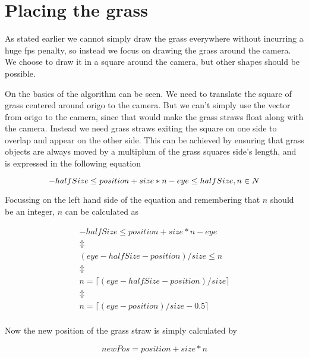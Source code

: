 \section{Placing the grass}

As stated earlier we cannot simply draw the grass everywhere without
incurring a huge fps penalty, so instead we focus on drawing the grass
around the camera. We choose to draw it in a square around the camera,
but other shapes should be possible.


On  the basics of the algorithm can be
seen. We need to translate the square of grass centered around origo
to the camera. But we can't simply use the vector from origo to the
camera, since that would make the grass straws float along with the
camera. Instead we need grass straws exiting the square on one side to
overlap and appear on the other side. This can be achieved by ensuring
that grass objects are always moved by a multiplum of the grass
squares side's length, and is expressed in the following equation

\begin{displaymath}
    -halfSize \le position + size * n - eye \le halfSize, n \in N \\
\end{displaymath}

Focussing on the left hand side of the equation and remembering that
$n$ should be an integer, $n$ can be calculated as 

\begin{displaymath}
  \begin{array}{l}
    -halfSize \le position + size * n - eye \\
    \Updownarrow \\
    (eye - halfSize - position) / size \le n \\
    \Updownarrow \\
    n = \lceil (eye - halfSize - position) / size \rceil \\
    \Updownarrow \\
    n = \lceil (eye - position) / size - 0.5 \rceil \\
  \end{array}
\end{displaymath}

Now the new position of the grass straw is simply calculated by 

\begin{displaymath}
  newPos = position + size * n
\end{displaymath}

